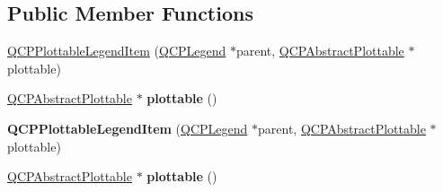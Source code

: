 \subsection*{Public Member Functions}
\begin{DoxyCompactItemize}
\item 
\hyperlink{class_q_c_p_plottable_legend_item_ac1072591fe409d3dabad51b23ee4d6c5}{Q\+C\+P\+Plottable\+Legend\+Item} (\hyperlink{class_q_c_p_legend}{Q\+C\+P\+Legend} $\ast$parent, \hyperlink{class_q_c_p_abstract_plottable}{Q\+C\+P\+Abstract\+Plottable} $\ast$plottable)
\item 
\hyperlink{class_q_c_p_abstract_plottable}{Q\+C\+P\+Abstract\+Plottable} $\ast$ {\bfseries plottable} ()\hypertarget{class_q_c_p_plottable_legend_item_af29e9a2c60b4cba0cac2447b8af7b488}{}\label{class_q_c_p_plottable_legend_item_af29e9a2c60b4cba0cac2447b8af7b488}

\item 
{\bfseries Q\+C\+P\+Plottable\+Legend\+Item} (\hyperlink{class_q_c_p_legend}{Q\+C\+P\+Legend} $\ast$parent, \hyperlink{class_q_c_p_abstract_plottable}{Q\+C\+P\+Abstract\+Plottable} $\ast$plottable)\hypertarget{class_q_c_p_plottable_legend_item_ac1072591fe409d3dabad51b23ee4d6c5}{}\label{class_q_c_p_plottable_legend_item_ac1072591fe409d3dabad51b23ee4d6c5}

\item 
\hyperlink{class_q_c_p_abstract_plottable}{Q\+C\+P\+Abstract\+Plottable} $\ast$ {\bfseries plottable} ()\hypertarget{class_q_c_p_plottable_legend_item_af29e9a2c60b4cba0cac2447b8af7b488}{}\label{class_q_c_p_plottable_legend_item_af29e9a2c60b4cba0cac2447b8af7b488}

\end{DoxyCompactItemize}
